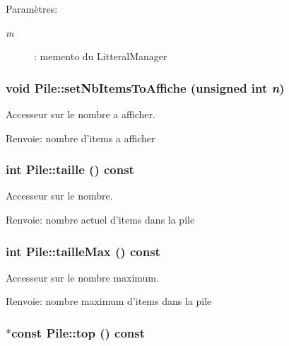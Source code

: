 \begin{Desc}
\item[Paramètres:]
\begin{description}
\item[{\em m}]: memento du LitteralManager \end{description}
\end{Desc}
\hypertarget{class_pile_a61a682bdd3b9dac5d1b25e481c453d1}{
\subsubsection[{setNbItemsToAffiche}]{\setlength{\rightskip}{0pt plus 5cm}void Pile::setNbItemsToAffiche (unsigned int {\em n})}}
\label{class_pile_a61a682bdd3b9dac5d1b25e481c453d1}


Accesseur sur le nombre a afficher. 

\begin{Desc}
\item[Renvoie:]nombre d'items a afficher \end{Desc}
\hypertarget{class_pile_5d004688a405e8588c46336aa9cac0d9}{
\subsubsection[{taille}]{\setlength{\rightskip}{0pt plus 5cm}int Pile::taille () const}}
\label{class_pile_5d004688a405e8588c46336aa9cac0d9}


Accesseur sur le nombre. 

\begin{Desc}
\item[Renvoie:]nombre actuel d'items dans la pile \end{Desc}
\hypertarget{class_pile_b6c6dc3469f0ab644c5813f81f15b6dc}{
\subsubsection[{tailleMax}]{\setlength{\rightskip}{0pt plus 5cm}int Pile::tailleMax () const}}
\label{class_pile_b6c6dc3469f0ab644c5813f81f15b6dc}


Accesseur sur le nombre maximum. 

\begin{Desc}
\item[Renvoie:]nombre maximum d'items dans la pile \end{Desc}
\hypertarget{class_pile_7e00e528aa0f5995a54941351659098f}{
\subsubsection[{top}]{ $\ast$const Pile::top () const}}
\label{class_pile_7e00e528aa0f5995a54941351659098f}


